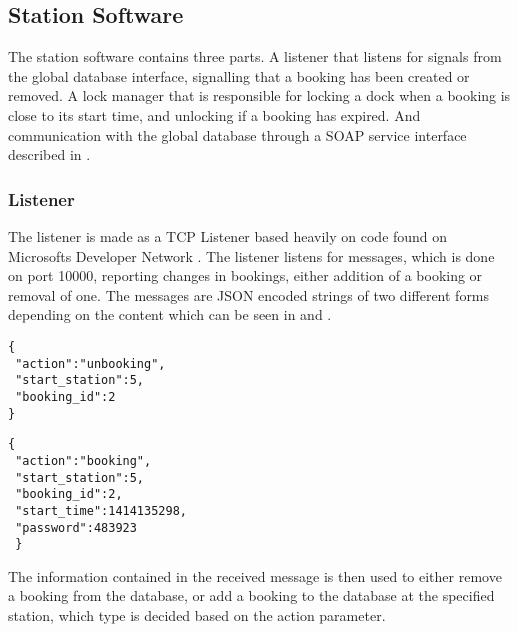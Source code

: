 \subsection{Station Software}
The station software contains three parts.
A listener that listens for signals from the global database interface, signalling that a booking has been created or removed.
A lock manager that is responsible for locking a dock when a booking is close to its start time, and unlocking if a booking has expired.
And communication with the global database through a SOAP service interface described in .

\subsubsection{Listener}\label{subsubsec:listener}
The listener is made as a TCP Listener based heavily on code found on Microsofts Developer Network \citep{misc:TcpListenerSource}. 
The listener listens for messages, which is done on port 10000, reporting changes in bookings, either addition of a booking or removal of one. 
The messages are JSON encoded strings of two different forms depending on the content which can be seen in  and .

\begin{minipage}{\textwidth}
\begin{minipage}{0.45\textwidth}
\begin{lstlisting}[caption = {Example of an unbooking message}, label = {lst:JsonUnbooking}]
{
 "action":"unbooking",
 "start_station":5,
 "booking_id":2
}
\end{lstlisting}
\end{minipage}
\hspace{0.5cm}
\begin{minipage}{0.45\textwidth}
\begin{lstlisting}[caption = {Example of a booking message}, label = {lst:JsonBooking}]
{
 "action":"booking",
 "start_station":5,
 "booking_id":2,
 "start_time":1414135298,
 "password":483923
 }
\end{lstlisting}
\end{minipage}
\end{minipage}

The information contained in the received message is then used to either remove a booking from the database, or add a booking to the database at the specified station, which type is decided based on the action parameter.

